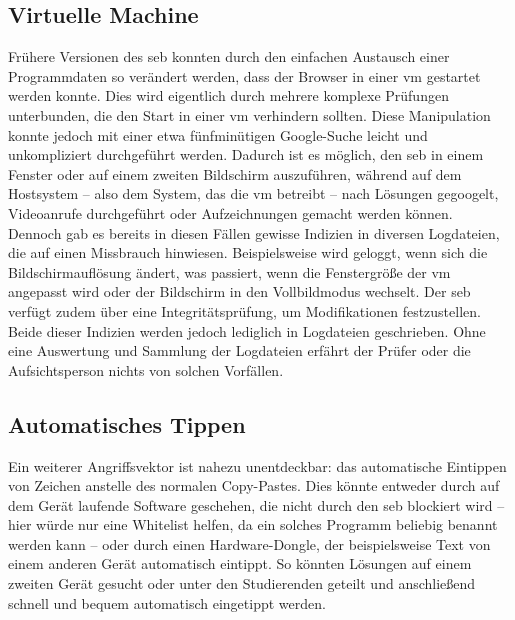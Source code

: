 \subsection{Virtuelle Machine}
Frühere Versionen des \gls{seb} konnten durch den einfachen Austausch einer Programmdaten so verändert werden, dass der Browser in einer \gls{vm} gestartet werden konnte. 
Dies wird eigentlich durch mehrere komplexe Prüfungen unterbunden, die den Start in einer \gls{vm} verhindern sollten. 
Diese Manipulation konnte jedoch mit einer etwa fünfminütigen Google-Suche leicht und unkompliziert durchgeführt werden. 
Dadurch ist es möglich, den \gls{seb} in einem Fenster oder auf einem zweiten Bildschirm auszuführen, während auf dem Hostsystem – also dem System, das die \gls{vm} betreibt – nach Lösungen gegoogelt, Videoanrufe durchgeführt oder Aufzeichnungen gemacht werden können.\\
Dennoch gab es bereits in diesen Fällen gewisse Indizien in diversen Logdateien, die auf einen Missbrauch hinwiesen. 
Beispielsweise wird geloggt, wenn sich die Bildschirmauflösung ändert, was passiert, wenn die Fenstergröße der \gls{vm} angepasst wird oder der Bildschirm in den Vollbildmodus wechselt. 
Der \gls{seb} verfügt zudem über eine Integritätsprüfung, um Modifikationen festzustellen.\\
Beide dieser Indizien werden jedoch lediglich in Logdateien geschrieben. 
Ohne eine Auswertung und Sammlung der Logdateien erfährt der Prüfer oder die Aufsichtsperson nichts von solchen Vorfällen.

\subsection{Automatisches Tippen}
Ein weiterer Angriffsvektor ist nahezu unentdeckbar: das automatische Eintippen von Zeichen anstelle des normalen Copy-Pastes. 
Dies könnte entweder durch auf dem Gerät laufende Software geschehen, die nicht durch den \gls{seb} blockiert wird – hier würde nur eine Whitelist helfen, da ein solches Programm beliebig benannt werden kann – oder durch einen Hardware-Dongle, der beispielsweise Text von einem anderen Gerät automatisch eintippt. 
So könnten Lösungen auf einem zweiten Gerät gesucht oder unter den Studierenden geteilt und anschließend schnell und bequem automatisch eingetippt werden.

